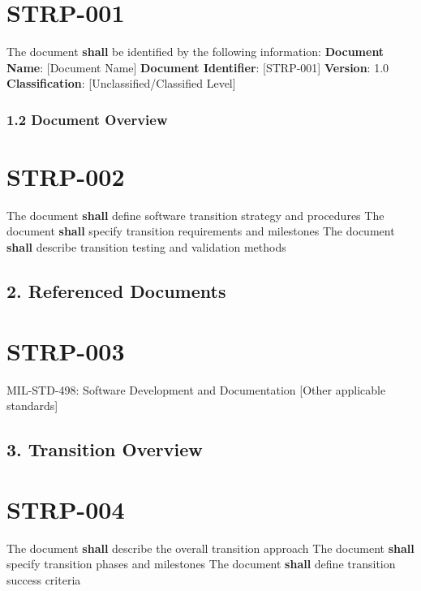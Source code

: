 \section{STRP-001}\label{STRP-001}

The document \textbf{shall} be identified by the following information:
\textbf{Document Name}: [Document Name]
\textbf{Document Identifier}: [STRP-001]
\textbf{Version}: 1.0
\textbf{Classification}: [Unclassified/Classified Level]

\subsubsection{1.2 Document Overview}

\section{STRP-002}\label{STRP-002}

The document \textbf{shall} define software transition strategy and procedures
The document \textbf{shall} specify transition requirements and milestones
The document \textbf{shall} describe transition testing and validation methods

\subsection{2. Referenced Documents}

\section{STRP-003}\label{STRP-003}

MIL-STD-498: Software Development and Documentation
[Other applicable standards]\\

\subsection{3. Transition Overview}

\section{STRP-004}\label{STRP-004}

The document \textbf{shall} describe the overall transition approach
The document \textbf{shall} specify transition phases and milestones
The document \textbf{shall} define transition success criteria

